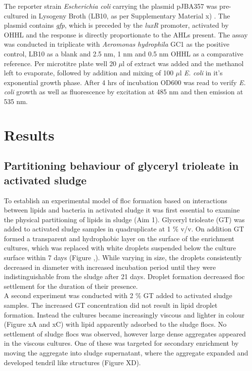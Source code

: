 \documentclass[twoside]{article}
\begin{document}
 The reporter strain \emph{Escherichia coli} carrying the plasmid pJBA357 was pre-cultured in Lysogeny Broth (LB10, as per Supplementary Material x) \cite{bertani1951studies}. The plasmid contains \emph{gfp}, which  is preceded by the \emph{luxR} promoter, activated by OHHL and the response is directly proportionate to the AHLs present.
The assay was conducted in triplicate with \emph{Aeromonas hydrophila} GC1 as the positive control, LB10 as a blank and 2.5 nm, 1 nm and 0.5 nm OHHL as a comparative reference. Per microtitre plate well 20 $\mu$l of extract was added and the methanol left to evaporate, followed by addition and mixing of 100 $\mu$l \emph{E. coli} in it's exponential growth phase. After 4 hrs of incubation OD600 was read to verify \emph{E. coli} growth as well as fluorescence by excitation at 485 nm and then emission at 535 nm.
\newpage
\section{Results}
\thispagestyle{plain}
\subsection{Partitioning behaviour of glyceryl trioleate in activated sludge}

To establish an experimental model of floc formation based on interactions between lipids and bacteria in activated sludge it was first essential to examine the physical partitioning of lipids in sludge (Aim 1). Glyceryl trioleate (GT) was added to activated sludge samples in quadruplicate at 1 \% v/v. On addition GT formed a transparent and hydrophobic layer on the surface of the enrichment cultures, which was replaced with white droplets suspended below the culture surface within 7 days (Figure ,). While varying in size, the droplets consistently decreased in diameter with increased incubation period until they were indistinguishable from the sludge after 21 days. Droplet formation decreased floc settlement for the duration of their presence.\\

A second experiment was conducted with 2 \% GT added to activated sludge samples. The increased GT concentration did not result in lipid droplet formation. Instead the cultures became increasingly viscous and lighter in colour (Figure xA and xC) with lipid apparently adsorbed to the sludge flocs. No settlement of sludge flocs was observed, however large dense aggregates appeared in the viscous cultures. One of these was targeted for secondary enrichment by moving the aggregate into sludge supernatant, where the aggregate expanded and developed tendril like structures (Figure XD).
\end{document}
